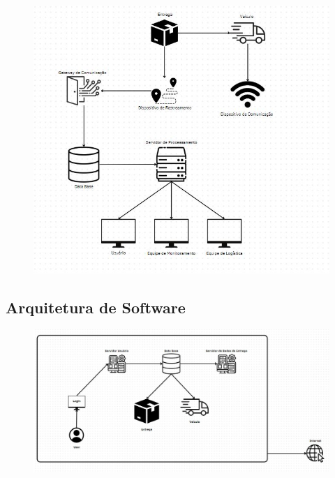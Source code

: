 	\begin{figure}[H]
		\centering
		\includegraphics[width=1.2\linewidth]{Pictures/Arq2}
		\caption{}
		\label{fig:arq1}
	\end{figure}

    \subsection{Arquitetura de Software}
    
	\begin{figure}[H]
		\centering
		\includegraphics[width=1.2\linewidth]{Pictures/Arq1}
		\caption{}
		\label{fig:arq2}
	\end{figure}


